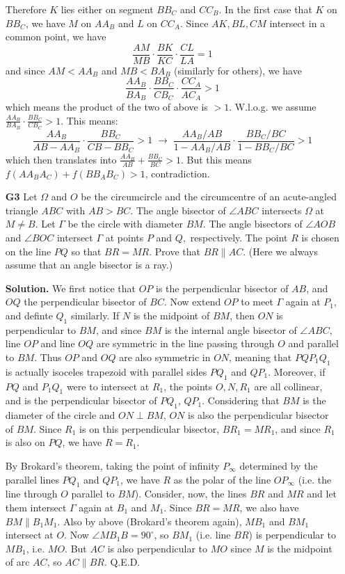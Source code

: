 \documentclass[11pt,a4paper]{article}
\begin{document}
\begin{enumerate}
	Therefore $K$ lies either on segment $BB_C$ and $CC_B$. In the first case that $K$ on $BB_C$, we have $M$ on $AA_B$ and $L$ on $CC_A$. Since $AK, BL, CM$ intersect in a common point, we have 
	\[
	\frac{AM}{MB}\cdot \frac{BK}{KC}\cdot \frac{CL}{LA} = 1
	\]
	and since $AM < AA_B$ and $MB < BA_B$ (similarly for others), we have 
	\[
	\frac{AA_B}{BA_B}\cdot \frac{BB_C}{CB_C}\cdot \frac{CC_A}{AC_A} > 1
	\]
	which means the product of the two of above is $>1$. W.l.o.g. we assume $\frac{AA_B}{BA_B}\cdot \frac{BB_C}{CB_C} > 1$. This means: 
	\[
	\frac{AA_B}{AB-AA_B}\cdot \frac{BB_C}{CB - BB_C} > 1\;\to
	\;
	\frac{AA_B/AB}{1-AA_B/AB}\cdot \frac{BB_C/BC}{1 - BB_C/BC} > 1
	\]
	which then translates into $\frac{AA_B}{AB}+\frac{BB_C}{BC}>1$. But this means $f(AA_BA_C)+f(BB_AB_C) > 1$, contradiction. 
	
	\item [\textbf{G3}] Let $\Omega$ and $O$ be the circumcircle and the circumcentre of an acute-angled triangle $ABC$ with $AB > BC$. The angle bisector of $\angle ABC$ intersects $\Omega$ at $M \ne B$. Let $\Gamma$ be the circle with diameter $BM$. The angle bisectors of $\angle AOB$ and $\angle BOC$ intersect $\Gamma$ at points $P$ and $Q,$ respectively. The point $R$ is chosen on the line $P Q$ so that $BR = MR$. Prove that $BR\parallel AC$.
	(Here we always assume that an angle bisector is a ray.)
	
	\textbf{Solution.} We first notice that $OP$ is the perpendicular bisector of $AB$, and $OQ$ the perpendicular bisector of $BC$. Now extend $OP$ to meet $\Gamma$ again at $P_1$, and definte $Q_1$ similarly. 
	If $N$ is the midpoint of $BM$, then $ON$ is perpendicular to $BM$, and since $BM$ is the internal angle bisector of $\angle ABC$, line $OP$ and line $OQ$ are symmetric in the line passing through $O$ and parallel to $BM$. Thus $OP$ and $OQ$ are also symmetric in $ON$, meaning that $PQP_1Q_1$ is actually isoceles trapezoid with parallel sides $PQ_1$ and $QP_1$. 
	Moreover, if $PQ$ and $P_1Q_1$ were to intersect at $R_1$, the points $O, N, R_1$ are all collinear, and is the perpendicular bisector of $PQ_1$, $QP_1$. Considering that $BM$ is the diameter of the circle and $ON\perp BM$, $ON$ is also the perpendicular bisector of $BM$. Since $R_1$ is on this perpendicular bisector, $BR_1=MR_1$, and since $R_1$ is also on $PQ$, we have $R=R_1$. 
	
	By Brokard's theorem, taking the point of infinity $P_{\infty}$ determined by the parallel lines $PQ_1$ and $QP_1$, we have $R$ as the polar of the line $OP_{\infty}$ (i.e. the line through $O$ parallel to $BM$). Consider, now, the lines $BR$ and $MR$ and let them intersect $\Gamma$ again at $B_1$ and $M_1$. Since $BR=MR$, we also have $BM\parallel B_1M_1$. Also by above (Brokard's theorem again), $MB_1$ and $BM_1$ intersect at $O$. Now $\angle MB_1B=90^{\circ}$, so $BM_1$ (i.e. line $BR$) is perpendicular to $MB_1$, i.e. $MO$. But $AC$ is also perpendicular to $MO$ since $M$ is the midpoint of arc $AC$, so $AC\parallel BR$. Q.E.D. 
	

\end{enumerate}
\end{document}
